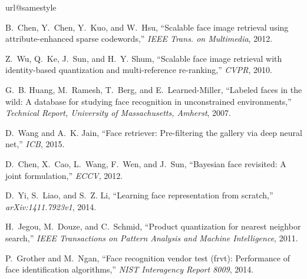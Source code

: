 \documentclass[10pt,journal,compsoc]{IEEEtran}
\begin{document}

\balance
\begin{thebibliography}{10}
\providecommand{\url}[1]{#1}
\csname url@samestyle\endcsname
\providecommand{\newblock}{\relax}
\providecommand{\bibinfo}[2]{#2}
\providecommand{\BIBentrySTDinterwordspacing}{\spaceskip=0pt\relax}
\providecommand{\BIBentryALTinterwordstretchfactor}{4}
\providecommand{\BIBentryALTinterwordspacing}{\spaceskip=\fontdimen2\font plus
\BIBentryALTinterwordstretchfactor\fontdimen3\font minus
  \fontdimen4\font\relax}
\providecommand{\BIBforeignlanguage}[2]{{\expandafter\ifx\csname l@#1\endcsname\relax
\typeout{** WARNING: IEEEtran.bst: No hyphenation pattern has been}\typeout{** loaded for the language `#1'. Using the pattern for}\typeout{** the default language instead.}\else
\language=\csname l@#1\endcsname
\fi
#2}}
\providecommand{\BIBdecl}{\relax}
\BIBdecl

B.~Chen, Y.~Chen, Y.~Kuo, and W.~Hsu, ``Scalable face image retrieval using
  attribute-enhanced sparse codewords,'' \emph{IEEE Trans. on Multimedia},
  2012.

Z.~Wu, Q.~Ke, J.~Sun, and H.~Y. Shum, ``Scalable face image retrieval with
  identity-based quantization and multi-reference re-ranking,'' \emph{CVPR},
  2010.

G.~B. Huang, M.~Ramesh, T.~Berg, and E.~Learned-Miller, ``Labeled faces in the
  wild: A database for studying face recognition in unconstrained
  environments,'' \emph{Technical Report, University of Massachusetts,
  Amherst}, 2007.

D.~Wang and A.~K. Jain, ``Face retriever: Pre-filtering the gallery via deep
  neural net,'' \emph{ICB}, 2015.

D.~Chen, X.~Cao, L.~Wang, F.~Wen, and J.~Sun, ``Bayesian face revisited: A
  joint formulation,'' \emph{ECCV}, 2012.

D.~Yi, S.~Liao, and S.~Z. Li, ``Learning face representation from scratch,''
  \emph{arXiv:1411.7923v1}, 2014.

H.~Jegou, M.~Douze, and C.~Schmid, ``Product quantization for nearest neighbor
  search,'' \emph{IEEE Transactions on Pattern Analysis and Machine
  Intelligence}, 2011.

P.~Grother and M.~Ngan, ``Face recognition vendor test (frvt): Performance of
  face identification algorithms,'' \emph{NIST Interagency Report 8009}, 2014.


\end{thebibliography}
\end{document}
